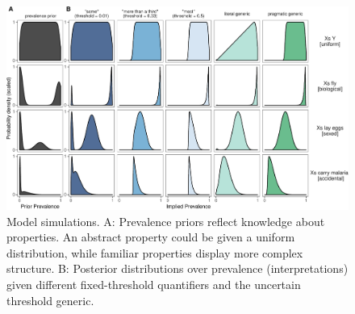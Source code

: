 \documentclass[floatsintext,doc]{apa6}
\begin{document}
\begin{figure}
\centering
\includegraphics{genint_files/figure-latex/modelSimulations-1.pdf}
\caption{\label{fig:modelSimulations}Model simulations. A: Prevalence priors reflect knowledge about properties. An abstract property could be given a uniform distribution, while familiar properties display more complex structure. B: Posterior distributions over prevalence (interpretations) given different fixed-threshold quantifiers and the uncertain threshold generic.}
\end{figure}
\end{document}
